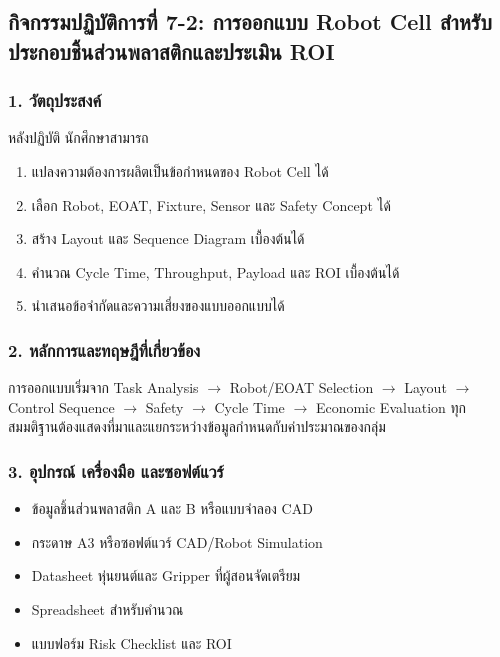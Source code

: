 \subsection{กิจกรรมปฏิบัติการที่ 7-2: การออกแบบ Robot Cell สำหรับประกอบชิ้นส่วนพลาสติกและประเมิน ROI}

\subsubsection{1. วัตถุประสงค์}

หลังปฏิบัติ นักศึกษาสามารถ

\begin{enumerate}
    \item แปลงความต้องการผลิตเป็นข้อกำหนดของ Robot Cell ได้
    \item เลือก Robot, EOAT, Fixture, Sensor และ Safety Concept ได้
    \item สร้าง Layout และ Sequence Diagram เบื้องต้นได้
    \item คำนวณ Cycle Time, Throughput, Payload และ ROI เบื้องต้นได้
    \item นำเสนอข้อจำกัดและความเสี่ยงของแบบออกแบบได้
\end{enumerate}

\subsubsection{2. หลักการและทฤษฎีที่เกี่ยวข้อง}

การออกแบบเริ่มจาก Task Analysis \(\rightarrow\) Robot/EOAT Selection \(\rightarrow\) Layout \(\rightarrow\) Control Sequence \(\rightarrow\) Safety \(\rightarrow\) Cycle Time \(\rightarrow\) Economic Evaluation ทุกสมมติฐานต้องแสดงที่มาและแยกระหว่างข้อมูลกำหนดกับค่าประมาณของกลุ่ม

\subsubsection{3. อุปกรณ์ เครื่องมือ และซอฟต์แวร์}

\begin{itemize}
    \item ข้อมูลชิ้นส่วนพลาสติก A และ B หรือแบบจำลอง CAD
    \item กระดาษ A3 หรือซอฟต์แวร์ CAD/Robot Simulation
    \item Datasheet หุ่นยนต์และ Gripper ที่ผู้สอนจัดเตรียม
    \item Spreadsheet สำหรับคำนวณ
    \item แบบฟอร์ม Risk Checklist และ ROI
\end{itemize}

